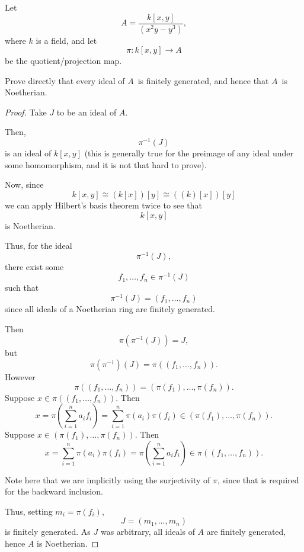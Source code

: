\documentclass[11pt]{article}
\begin{document}
\begin{prob}
    Let 
    \[
        A = \frac{k[x,y]}{(x^2y-y^3)},  
    \]
    where $k$ is a field, and let 
    \[
        \pi : k[x,y] \to A
    \]
    be the quotient/projection map.  

    Prove directly that every ideal of 
    $A$ is finitely generated, and 
    hence that $A$ is Noetherian. 
\end{prob}

\begin{proof}
    Take $J$ to be an ideal of $A$. 

    Then,  
    \[
        \pi^{-1}(J) 
    \]
    is an ideal of $k[x,y]$ (this is generally 
    true for the preimage of any ideal under some 
    homomorphism, and it is not that hard to prove). 

    Now, since 
    \[
        k[x,y] \cong (k[x])[y] \cong ((k)[x])[y]
    \]
    we can apply Hilbert's basis theorem twice 
    to see that  
    \[
        k[x,y]
    \]
    is Noetherian. 

    Thus, for the ideal 
    \[
        \pi^{-1}(J), 
    \]
    there exist some 
    \[
        f_1,\ldots,f_n \in \pi^{-1}(J) 
    \]
    such that 
    \[
        \pi^{-1}(J) = (f_1,\ldots,f_n) 
    \]
    since all ideals of a Noetherian 
    ring are finitely generated. 

    Then 
    \[
        \pi(\pi^{-1}(J)) = J, 
    \]
    but 
    \[
        \pi(\pi^{-1})(J) = \pi((f_1,\ldots,f_n)). 
    \]
    However 
    \[
        \pi((f_1,\ldots,f_n)) = (\pi(f_1),\ldots,\pi(f_n)). 
    \]
    Suppose $x \in \pi((f_1,\ldots,f_n))$. 
    Then 
    \[
        x = \pi\left(\sum_{i=1}^n a_if_i\right)
        = \sum_{i=1}^n \pi(a_i)\pi(f_i) \in 
        (\pi(f_1), \ldots, \pi(f_n)). 
    \]
    Suppose $x \in (\pi(f_1),\ldots,\pi(f_n))$. 
    Then 
    \[
        x = \sum_{i=1}^n \pi(a_i)\pi(f_i) 
        = \pi\left(\sum_{i=1}^n a_if_i\right) 
        \in \pi((f_1,\ldots,f_n)). 
    \]

    Note here that we are implicitly using the surjectivity 
    of $\pi$, since that is required for 
    the backward inclusion. 

    Thus, setting $m_i = \pi(f_i)$, 
    \[
        J = (m_1,\ldots,m_n)
    \]
    is finitely generated. 
    As $J$ was arbitrary, all 
    ideals of $A$ are finitely generated, hence 
    $A$ is Noetherian. 
\end{proof}
\end{document}
